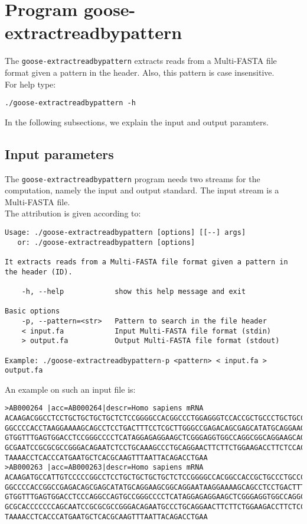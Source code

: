 \section{Program goose-extractreadbypattern}
The \texttt{goose-extractreadbypattern} extracts reads from a Multi-FASTA file format given a pattern in the header. Also, this pattern is case insensitive. \\
For help type:
\begin{lstlisting}
./goose-extractreadbypattern -h
\end{lstlisting}
In the following subsections, we explain the input and output paramters.

\subsection*{Input parameters}

The \texttt{goose-extractreadbypattern} program needs two streams for the computation,
namely the input and output standard. The input stream is a Multi-FASTA file.\\
The attribution is given according to:
\begin{lstlisting}
Usage: ./goose-extractreadbypattern [options] [[--] args]
   or: ./goose-extractreadbypattern [options]

It extracts reads from a Multi-FASTA file format given a pattern in the header (ID).

    -h, --help            show this help message and exit

Basic options
    -p, --pattern=<str>   Pattern to search in the file header
    < input.fa            Input Multi-FASTA file format (stdin)
    > output.fa           Output Multi-FASTA file format (stdout)

Example: ./goose-extractreadbypattern-p <pattern> < input.fa > output.fa
\end{lstlisting}
An example on such an input file is:
\begin{lstlisting}
>AB000264 |acc=AB000264|descr=Homo sapiens mRNA 
ACAAGACGGCCTCCTGCTGCTGCTGCTCTCCGGGGCCACGGCCCTGGAGGGTCCACCGCTGCCCTGCTGCCATTGTCCCC
GGCCCCACCTAAGGAAAAGCAGCCTCCTGACTTTCCTCGCTTGGGCCGAGACAGCGAGCATATGCAGGAAGCGGCAGGAA
GTGGTTTGAGTGGACCTCCGGGCCCCTCATAGGAGAGGAAGCTCGGGAGGTGGCCAGGCGGCAGGAAGCAGGCCAGTGCC
GCGAATCCGCGCGCCGGGACAGAATCTCCTGCAAAGCCCTGCAGGAACTTCTTCTGGAAGACCTTCTCCACCCCCCCAGC
TAAAACCTCACCCATGAATGCTCACGCAAGTTTAATTACAGACCTGAA
>AB000263 |acc=AB000263|descr=Homo sapiens mRNA 
ACAAGATGCCATTGTCCCCCGGCCTCCTGCTGCTGCTGCTCTCCGGGGCCACGGCCACCGCTGCCCTGCCCCTGGAGGGT
GGCCCCACCGGCCGAGACAGCGAGCATATGCAGGAAGCGGCAGGAATAAGGAAAAGCAGCCTCCTGACTTTCCTCGCTTG
GTGGTTTGAGTGGACCTCCCAGGCCAGTGCCGGGCCCCTCATAGGAGAGGAAGCTCGGGAGGTGGCCAGGCGGCAGGAAG
GCGCACCCCCCCAGCAATCCGCGCGCCGGGACAGAATGCCCTGCAGGAACTTCTTCTGGAAGACCTTCTCCTCCTGCAAA
TAAAACCTCACCCATGAATGCTCACGCAAGTTTAATTACAGACCTGAA
\end{lstlisting}

